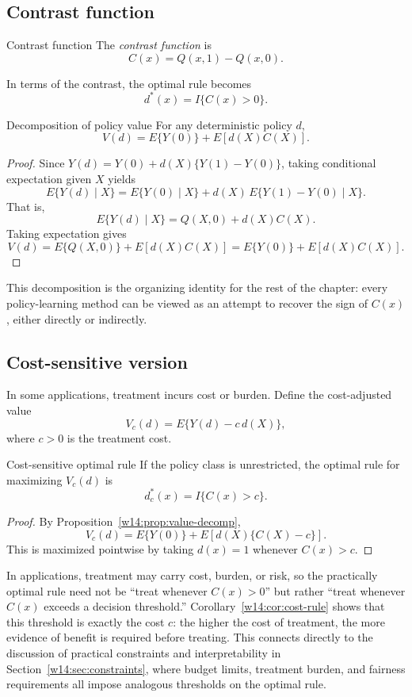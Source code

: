 \documentclass[master.tex]{subfiles}
\begin{document}
\subsection{Contrast function}

\begin{defn}{Contrast function}
\label{w14:defn:contrast}
The \emph{contrast function} is
\[
C(x)=Q(x,1)-Q(x,0).
\]
\end{defn}

In terms of the contrast, the optimal rule becomes
\[
d^\ast(x)=I\{C(x)>0\}.
\]

\begin{prop}{Decomposition of policy value}
\label{w14:prop:value-decomp}
For any deterministic policy \(d\),
\[
V(d)=E\{Y(0)\}+E[d(X)C(X)].
\]
\end{prop}

\begin{proof}
Since \(Y(d)=Y(0)+d(X)\{Y(1)-Y(0)\}\), taking conditional expectation given \(X\) yields
\[
E\{Y(d)\mid X\}=E\{Y(0)\mid X\}+d(X)\,E\{Y(1)-Y(0)\mid X\}.
\]
That is,
\[
E\{Y(d)\mid X\}=Q(X,0)+d(X)C(X).
\]
Taking expectation gives
\[
V(d)=E\{Q(X,0)\}+E[d(X)C(X)]=E\{Y(0)\}+E[d(X)C(X)].
\]
\end{proof}

This decomposition is the organizing identity for the rest of the chapter: every policy-learning method can be viewed as an attempt to recover the sign of \(C(x)\), either directly or indirectly.

\subsection{Cost-sensitive version}

In some applications, treatment incurs cost or burden. Define the cost-adjusted value
\[
V_c(d)=E\{Y(d)-c\,d(X)\},
\]
where \(c>0\) is the treatment cost.

\begin{cor}{Cost-sensitive optimal rule}
\label{w14:cor:cost-rule}
If the policy class is unrestricted, the optimal rule for maximizing \(V_c(d)\) is
\[
d_c^\ast(x)=I\{C(x)>c\}.
\]
\end{cor}

\begin{proof}
By Proposition~\ref{w14:prop:value-decomp},
\[
V_c(d)=E\{Y(0)\}+E[d(X)\{C(X)-c\}].
\]
This is maximized pointwise by taking \(d(x)=1\) whenever \(C(x)>c\).
\end{proof}

In applications, treatment may carry cost, burden, or risk, so the practically optimal rule need not be ``treat whenever \(C(x)>0\)'' but rather ``treat whenever \(C(x)\) exceeds a decision threshold.'' Corollary~\ref{w14:cor:cost-rule} shows that this threshold is exactly the cost \(c\): the higher the cost of treatment, the more evidence of benefit is required before treating. This connects directly to the discussion of practical constraints and interpretability in Section~\ref{w14:sec:constraints}, where budget limits, treatment burden, and fairness requirements all impose analogous thresholds on the optimal rule.
\end{document}
